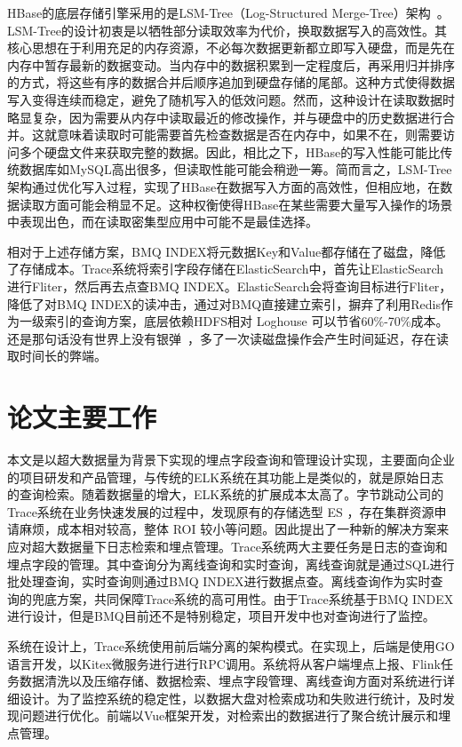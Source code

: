 HBase的底层存储引擎采用的是LSM-Tree（Log-Structured Merge-Tree）架构~\cite{吴加禹2020一种读写均衡的高性能键值存储系统}。LSM-Tree的设计初衷是以牺牲部分读取效率为代价，换取数据写入的高效性。其核心思想在于利用充足的内存资源，不必每次数据更新都立即写入硬盘，而是先在内存中暂存最新的数据变动。当内存中的数据积累到一定程度后，再采用归并排序的方式，将这些有序的数据合并后顺序追加到硬盘存储的尾部。这种方式使得数据写入变得连续而稳定，避免了随机写入的低效问题。然而，这种设计在读取数据时略显复杂，因为需要从内存中读取最近的修改操作，并与硬盘中的历史数据进行合并。这就意味着读取时可能需要首先检查数据是否在内存中，如果不在，则需要访问多个硬盘文件来获取完整的数据。因此，相比之下，HBase的写入性能可能比传统数据库如MySQL高出很多，但读取性能可能会稍逊一筹。简而言之，LSM-Tree架构通过优化写入过程，实现了HBase在数据写入方面的高效性，但相应地，在数据读取方面可能会稍显不足。这种权衡使得HBase在某些需要大量写入操作的场景中表现出色，而在读取密集型应用中可能不是最佳选择。

相对于上述存储方案，BMQ INDEX将元数据Key和Value都存储在了磁盘，降低了存储成本。Trace系统将索引字段存储在ElasticSearch中，首先让ElasticSearch进行Fliter，然后再去点查BMQ INDEX。ElasticSearch会将查询目标进行Fliter，降低了对BMQ INDEX的读冲击，通过对BMQ直接建立索引，摒弃了利用Redis作为一级索引的查询方案，底层依赖HDFS相对 Loghouse 可以节省60$\%$-70$\%$成本。还是那句话没有世界上没有银弹~\cite{金芝2019寻找软件开发的}，多了一次读磁盘操作会产生时间延迟，存在读取时间长的弊端。

\section{论文主要工作}
本文是以超大数据量为背景下实现的埋点字段查询和管理设计实现，主要面向企业的项目研发和产品管理，与传统的ELK系统在其功能上是类似的，就是原始日志的查询检索。随着数据量的增大，ELK系统的扩展成本太高了。字节跳动公司的Trace系统在业务快速发展的过程中，发现原有的存储选型 ES ，存在集群资源申请麻烦，成本相对较高，整体 ROI 较小等问题。因此提出了一种新的解决方案来应对超大数据量下日志检索和埋点管理。Trace系统两大主要任务是日志的查询和埋点字段的管理。其中查询分为离线查询和实时查询，离线查询就是通过SQL进行批处理查询，实时查询则通过BMQ INDEX进行数据点查。离线查询作为实时查询的兜底方案，共同保障Trace系统的高可用性。由于Trace系统基于BMQ INDEX进行设计，但是BMQ目前还不是特别稳定，项目开发中也对查询进行了监控。

系统在设计上，Trace系统使用前后端分离的架构模式。在实现上，后端是使用GO语言开发，以Kitex微服务进行进行RPC调用。系统将从客户端埋点上报、Flink任务数据清洗以及压缩存储、数据检索、埋点字段管理、离线查询方面对系统进行详细设计。为了监控系统的稳定性，以数据大盘对检索成功和失败进行统计，及时发现问题进行优化。前端以Vue框架开发，对检索出的数据进行了聚合统计展示和埋点管理。
